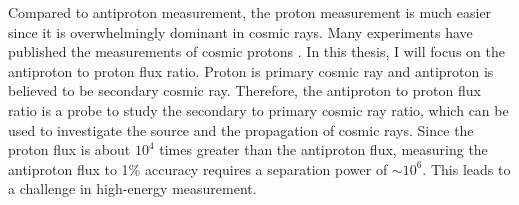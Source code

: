Compared to antiproton measurement, the proton measurement is much easier since it is overwhelmingly dominant in cosmic rays. Many experiments have published the measurements of cosmic protons \cite{AMS02ProtonPaper, DAMPEProton2019, PAMELAProton2011, ATIC2Proton2009, CREAMIIIProton, NUCLEON-KLEMProton}. In this thesis, I will focus on the antiproton to proton flux ratio. Proton is primary cosmic ray and antiproton is believed to be secondary cosmic ray. Therefore, the antiproton to proton flux ratio is a probe to study the secondary to primary cosmic ray ratio, which can be used to investigate the source and the propagation of cosmic rays. Since the proton flux is about $10^4$ times greater than the antiproton flux, measuring the antiproton flux to 1\% accuracy requires a separation power of $\sim 10^6$. This leads to a challenge in high-energy measurement. 
   

